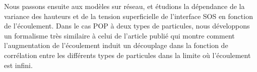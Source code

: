 Nous passons ensuite aux modèles sur réseau, et étudions la dépendance de la variance des hauteurs et de la tension superficielle de l'interface SOS en fonction de l'écoulement. Dans le cas POP à deux types de particules, nous développons un formalisme très similaire à celui de l'article publié qui montre comment l'augmentation de l'écoulement induit un découplage dans la fonction de corrélation entre les différents types de particules dans la limite où l'écoulement est infini.